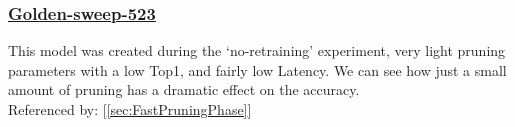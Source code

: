 \documentclass[11pt]{article}
\begin{document}
\subsubsection*{\protect\href{https://wandb.ai/samfh/Resnet56-Filters-Test/runs/eje5tk6m/overview?workspace=}{\underline{\color{blue}Golden-sweep-523}}}\label{sec:golden-sweep-523}
This model was created during the `no-retraining' experiment, very light pruning parameters with a low Top1, and fairly low Latency. We can see how just a small amount of pruning has a dramatic effect on the accuracy.\\
Referenced by: [\ref{sec:FastPruningPhase}]
\begin{table}[H]
    \centering
    \hspace{2em}
\end{table}


\newpage
\end{document}
